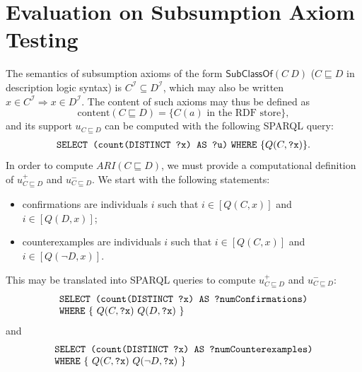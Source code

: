 \documentclass{llncs}
\begin{document}
\section{Evaluation on Subsumption Axiom Testing}
\label{evaluation}
The semantics of subsumption axioms of the form $\mathsf{SubClassOf}(C\ D)$
($C \sqsubseteq D$ in description logic syntax) is $C^\mathcal{I} \subseteq D^\mathcal{I}$,
which may also be written $x \in C^\mathcal{I} \Rightarrow x \in D^\mathcal{I}$. 
The content of such axioms may thus be defined as
\begin{equation}
  \mathrm{content}(C \sqsubseteq D) = \{\mbox{$C(a)$ in the RDF store} \},
\end{equation}
and its support $u_{C \sqsubseteq D}$ can be computed with the following SPARQL query:
\begin{equation}
  \begin{minipage}[c]{5in}
    \begin{tabbing}
      \quad\=\quad\=\quad\=\kill
      \texttt{SELECT (count(DISTINCT ?x) AS ?u)}
      \texttt{WHERE} \{$Q(C, \mbox{\tt ?x})$\}.
    \end{tabbing}
  \end{minipage}
\end{equation}
In order to compute $ARI(C \sqsubseteq D)$, we must provide a computational definition of $u^+_{C \sqsubseteq D}$ and $u^-_{C \sqsubseteq D}$. We start with the following statements:
\begin{itemize}
\item confirmations are individuals $i$ such that
  $i \in [Q(C, x)]$ and $i \in [Q(D, x)]$;
\item counterexamples are individuals $i$ such that
  $i \in [Q(C, x)]$ and $i \in [Q(\neg D, x)]$.
\end{itemize}
This may be translated into SPARQL queries to compute $u^+_{C \sqsubseteq D}$ and $u^-_{C \sqsubseteq D}$:
\begin{equation}
  \begin{minipage}[c]{5in}
    \begin{tabbing}
      \quad\=\quad\=\quad\=\kill
      \texttt{SELECT (count(DISTINCT ?x) AS ?numConfirmations)}\\
      \texttt{WHERE} \{ $Q(C, \mbox{\tt ?x})$ $Q(D, \mbox{\tt ?x})$ \}
    \end{tabbing}
  \end{minipage}
\end{equation}
and
\begin{equation}
  \begin{minipage}[c]{5in}
    \begin{tabbing}
      \quad\=\quad\=\quad\=\kill
      \texttt{SELECT (count(DISTINCT ?x) AS ?numCounterexamples)}\\
      \texttt{WHERE} \{ $Q(C, \mbox{\tt ?x})$ $Q(\neg D, \mbox{\tt ?x})$ \}
    \end{tabbing}
  \end{minipage}
\end{equation}
\end{document}
